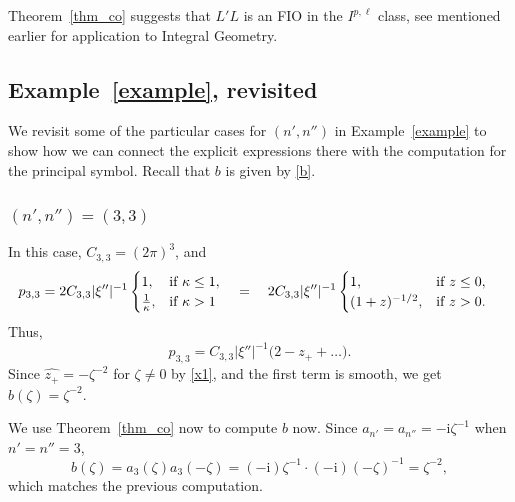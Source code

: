 \documentclass[11pt]{amsart}
\theoremstyle{definition}
\theoremstyle{remark}
\numberwithin{equation}{section}
\newcommand{\I}{\mathrm{i}}
\begin{document}
Theorem~\ref{thm_co} suggests that $L'L$ is an FIO in the $I^{p,\ell}$ class, see \cite{Greenleaf_Uhlmann90, Greenleaf_UhlmannCM, Greenleaf-Uhlmann} mentioned earlier for application to Integral Geometry.  

\subsection{Example~\ref{example}, revisited} 
We revisit some of the particular cases for $(n',n'')$ in Example~\ref{example} to show how we can connect the explicit expressions there with the computation for the principal symbol. Recall that $b$ is given by \eqref{b}. 

\subsubsection{$(n',n'')=(3,3)$} In this case, $C_{3,3}=(2\pi)^3$, and 
\begin{align*}
	p_{3,3} &= 2C_{3,3} |\xi''|^{-1} \begin{cases}
		1, &\text{if $\kappa \leq 1$}, \\
		\frac{1}{\kappa}, & \text{if $ \kappa > 1$}
	\end{cases} 
\quad 	= \quad 2C_{3,3} |\xi''|^{-1} \begin{cases}
		1, &\text{if $z \leq 0$}, \\
		(1+z)^{-1/2}, & \text{if $z > 0$}.
	\end{cases}
\end{align*}
Thus,
\[
p_{3,3} = C_{3,3}|\xi''|^{-1}\Big(2 -z_++\dots\Big).
\]
Since $\widehat{z_+} = - \zeta^{-2}$ for $\zeta\not=0$ by \eqref{x1}, and the first term is smooth, we get $b(\zeta) = \zeta^{-2}$. 

We use Theorem~\ref{thm_co} now to compute $b$ now. Since $a_{n'}=a_{n''} = -\I \zeta^{-1}$ when $n'=n''=3$, 
\[
b(\zeta) = a_{3}(\zeta) a_{3}(-\zeta) = (-\I) \zeta^{-1} \cdot (-\I) (-\zeta)^{-1} = \zeta^{-2}, 
\]
which matches the previous computation. 
\end{document}
